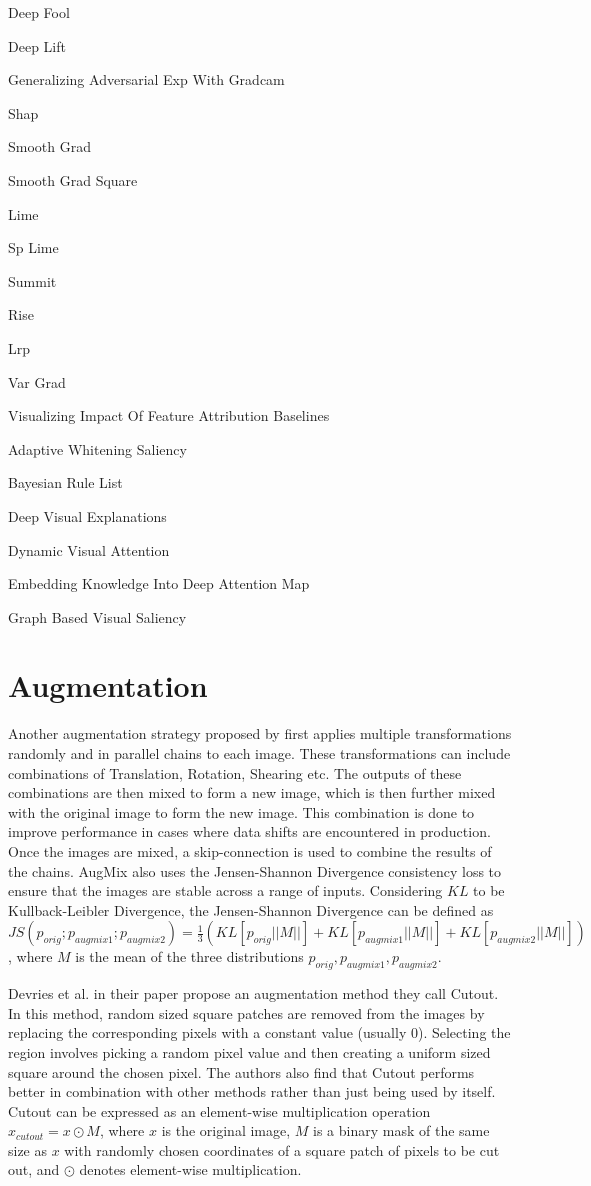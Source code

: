 Deep Fool

Deep Lift

Generalizing Adversarial Exp With Gradcam

Shap

Smooth Grad

Smooth Grad Square

Lime

Sp Lime

Summit

Rise

Lrp

Var Grad

Visualizing Impact Of Feature Attribution Baselines

Adaptive Whitening Saliency

Bayesian Rule List


Deep Visual Explanations

Dynamic Visual Attention

Embedding Knowledge Into Deep Attention Map

Graph Based Visual Saliency


\section{Augmentation}
Another augmentation strategy proposed by \cite{hendrycksAugMixSimpleData2020} first applies multiple transformations randomly and in parallel chains to each image. These transformations can include combinations of Translation, Rotation, Shearing etc. The outputs of these combinations are then mixed to form a new image, which is then further mixed with the original image to form the new image. This combination is done to improve performance in cases where data shifts are encountered in production. Once the images are mixed, a skip-connection is used to combine the results of the chains. AugMix also uses the Jensen-Shannon Divergence consistency loss \cite{linDivergenceMeasuresBased} to ensure that the images are stable across a range of inputs. Considering $KL$ to be Kullback-Leibler Divergence, the Jensen-Shannon Divergence can be defined as $
    JS(p_{orig}; p_{augmix1};p_{augmix2}) = \frac{1}{3}(KL[p_{orig}||M||]+KL[p_{augmix1}||M||]+KL[p_{augmix2}||M||])
$, where $M$ is the mean of the three distributions $p_{orig}, p_{augmix1}, p_{augmix2}$.

Devries et al. in their paper \cite{devriesImprovedRegularizationConvolutional2017} propose an augmentation method they call Cutout. In this method, random sized square patches are removed from the images by replacing the corresponding pixels with a constant value (usually 0). Selecting the region involves picking a random pixel value and then creating a uniform sized square around the chosen pixel. The authors also find that Cutout performs better in combination with other methods rather than just being used by itself. Cutout can be expressed as an element-wise multiplication operation $x_{cutout} = x \odot M$,
where $x$ is the original image, $M$ is a binary mask of the same size as $x$ with randomly chosen coordinates of a square patch of pixels to be cut out, and $\odot$ denotes element-wise multiplication.

